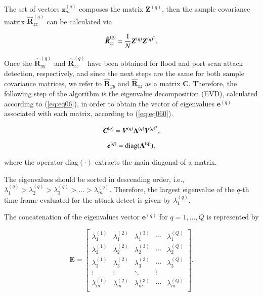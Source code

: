\documentclass[review]{elsarticle}
\begin{document}
The set of vectors $\boldsymbol{z}_{m}^{(q)}$ composes the matrix $\boldsymbol{Z}^{(q)}$, then the sample covariance matrix $\boldsymbol{\hat{R}}_{zz}^{(q)}$ can be calculated via 

\begin{equation}\label{eq:eq05}
\boldsymbol{\hat{R}}_{zz}^{(q)} = \frac{1}{N}\boldsymbol{Z}^{(q)}\boldsymbol{Z}^{(q)^{\rm T}}.
\end{equation}

Once the $\boldsymbol{\hat{R}}_{yy}^{(q)}$ and $\boldsymbol{\hat{R}}_{zz}^{(q)}$ have been obtained for flood and port scan attack detection, respectively, and since the next steps are the same for both sample covariance matrices, we refer to $\boldsymbol{\hat{R}}_{yy}$ and $\boldsymbol{\hat{R}}_{zz}$ as a matrix $\boldsymbol{C}$. Therefore, the following step of the algorithm is the eigenvalue decomposition (EVD), calculated according to (\ref{eq:eq06}), in order to obtain the vector of eigenvalues $\boldsymbol{e}^{(q)}$ associated with each matrix, according to (\ref{eq:eq060}).

\begin{equation}\label{eq:eq06}
\boldsymbol{C}^{(q)} = \boldsymbol{V}^{(q)}\boldsymbol{\Lambda}^{(q)}\boldsymbol{V}^{(q)^{\rm T}},
\end{equation}

\begin{equation}\label{eq:eq060}
\boldsymbol{e}^{(q)} = \rm diag(\boldsymbol{\Lambda}^{(q)}),
\end{equation}

where the operator diag$(\cdot)$ extracts the main diagonal of a matrix.

The eigenvalues should be sorted in descending order, i.e., $\lambda_{1}^{(q)} > \lambda_{2}^{(q)} > \lambda_{3}^{(q)} > ... > \lambda_{m}^{(q)}$. Therefore, the largest eigenvalue of the $q$-th time frame evaluated for the attack detect is given by $\lambda_{1}^{(q)}$.

The concatenation of the eigenvalues vector $\boldsymbol{e}^{(q)}$ for $q = 1, \ldots, Q$ is represented by

\begin{equation}\label{eq:eq07}
\boldsymbol{E} =
\begin{bmatrix}
  \lambda_1^{(1)} & \lambda_1^{(2)} & \lambda_1^{(3)} & \cdots & \lambda_1^{(Q)} \\
  \lambda_2^{(1)} & \lambda_2^{(2)} & \lambda_2^{(3)} & \cdots & \lambda_2^{(Q)} \\
  \lambda_3^{(1)} & \lambda_3^{(2)} & \lambda_3^{(3)} & \cdots & \lambda_3^{(Q)} \\
  \vdots & \vdots & \ddots & \vdots  \\
  \lambda_m^{(1)} & \lambda_m^{(2)} & \lambda_m^{(3)} & \cdots & \lambda_m^{(Q)} \\
\end{bmatrix}.
\end{equation}
\end{document}
